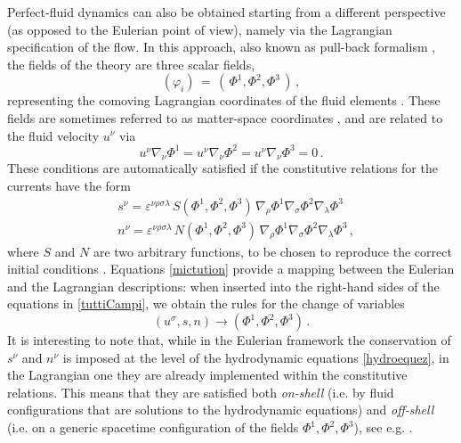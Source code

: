 \documentclass[a4paper, amsfonts, amssymb, amsmath, reprint, twocolumn, showkeys, nofootinbib]{revtex4-2}
\begin{document}
Perfect-fluid dynamics can also be obtained starting from a different perspective (as opposed to the Eulerian point of view), namely via the Lagrangian specification of the flow. In this approach, also known as pull-back formalism \citep{andersson2007review}, the fields of the theory are three scalar fields,
\begin{equation}\label{LagrangianFields}
(\varphi_i) \,=\, (\,\Phi^1,\Phi^2,\Phi^3\,)\, ,
\end{equation} 
representing the comoving Lagrangian coordinates of the fluid elements \citep{Comer_1993,prix2004,ballesteros_prd2016,Termo}. 
These fields are sometimes referred to as matter-space coordinates \citep{andersson2007review}, and are related to the fluid velocity $u^\nu$ via
\begin{equation}
u^\nu \nabla_\nu \Phi^1 = u^\nu \nabla_\nu \Phi^2 =u^\nu \nabla_\nu \Phi^3 =0 \, .
\end{equation}
These conditions are automatically satisfied if the constitutive relations for the currents have the form \begin{equation}\label{mictution}
\begin{split}
& s^\nu =\varepsilon^{\nu \rho \sigma \lambda} \, S(\Phi^1,\Phi^2,\Phi^3) \, \nabla_\rho \Phi^1 \nabla_\sigma \Phi^2 \nabla_\lambda \Phi^3 \\
& n^\nu = \varepsilon^{\nu \rho \sigma \lambda} \, N(\Phi^1,\Phi^2,\Phi^3) \, \nabla_\rho \Phi^1 \nabla_\sigma \Phi^2 \nabla_\lambda \Phi^3 \, , 
\end{split}
\end{equation}
where $S$ and $N$ are two arbitrary functions, to be chosen to reproduce the correct initial conditions \citep{andersson2007review}. 
Equations \eqref{mictution} provide a  mapping between the Eulerian and the Lagrangian descriptions: when inserted into the right-hand sides of the equations in  \eqref{tuttiCampi}, we obtain the rules for the change of variables 
\begin{equation}\label{ggrungoGringo}
(u^\sigma,s,n) \longrightarrow (\Phi^1,\Phi^2,\Phi^3) \, .
\end{equation}
It is interesting to note that, while in the Eulerian framework the conservation of $s^\nu$ and $n^\nu$ is imposed at the level of the hydrodynamic equations \eqref{hydroequez}, in the Lagrangian one they are already implemented within the constitutive relations. This means that they are satisfied both \textit{on-shell} (i.e. by fluid configurations that are solutions to the hydrodynamic equations) and \textit{off-shell} (i.e. on a generic spacetime configuration of the fields $\Phi^1,\Phi^2,\Phi^3$), see e.g. \citet{Comer_1993,Termo}. 
\end{document}
